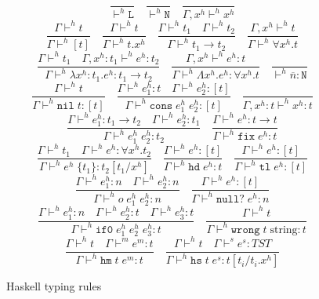 \begin{figure}[p]
\[
\frac{}{\vdash^h\mathtt{L}}
\quad
\frac{}{\vdash^h\mathtt{N}}
\quad
\frac{}{\Gamma,x^h\vdash^hx^h}
\]
\[
\frac{\Gamma\vdash^ht}{\Gamma\vdash^h[t]}
\quad
\frac{\Gamma\vdash^ht}{\Gamma\vdash^ht.x^h}
\quad
\frac{\Gamma\vdash^ht_1\quad\Gamma\vdash^ht_2}{\Gamma\vdash^ht_1\rightarrow t_2}
\quad
\frac{\Gamma,x^h\vdash^ht}{\Gamma\vdash^h\forall x^h.t}
\]
\bigskip
\[
\frac{\Gamma\vdash^ht_1\quad\Gamma,x^h:t_1\vdash^he^h:t_2}{\Gamma\vdash^h\lambda x^h:t_1.e^h:t_1\rightarrow t_2}
\quad
\frac{\Gamma,x^h\vdash^he^h:t}{\Gamma\vdash^h\Lambda x^h.e^h:\forall x^h.t}
\quad
\frac{}{\vdash^h\overline{n}:\mathtt{N}}
\]
\[
\frac{\Gamma\vdash^ht}{\Gamma\vdash^h\mathtt{nil}\;t:[t]}
\quad
\frac{\Gamma\vdash^he^h_1:t\quad\Gamma\vdash^he^h_2:[t]}{\Gamma\vdash^h\mathtt{cons}\;e^h_1\;e^h_2:[t]}
\quad
\frac{}{\Gamma,x^h:t\vdash^hx^h:t}
\]
\[
\frac{\Gamma\vdash^he^h_1:t_1\rightarrow t_2\quad\Gamma\vdash^he^h_2:t_1}{\Gamma\vdash^he^h_1\;e^h_2:t_2}
\quad
\frac{\Gamma\vdash^he^h:t\rightarrow t}{\Gamma\vdash^h\mathtt{fix}\;e^h:t}
\]
\[
\frac{\Gamma\vdash^ht_1\quad\Gamma\vdash^he^h:\forall x^h.t_2}{\Gamma\vdash^he^h\;\lbrace t_1\rbrace:t_2[t_1/x^h]}
\quad
\frac{\Gamma\vdash^he^h:[t]}{\Gamma\vdash^h\mathtt{hd}\;e^h:t}
\quad
\frac{\Gamma\vdash^he^h:[t]}{\Gamma\vdash^h\mathtt{tl}\;e^h:[t]}
\]
\[
\frac{\Gamma\vdash^he^h_1:n\quad\Gamma\vdash^he^h_2:n}{\Gamma\vdash^ho\;e^h_1\;e^h_2:n}
\quad
\frac{\Gamma\vdash^he^h:[t]}{\Gamma\vdash^h\mathtt{null?}\;e^h:n}
\]
\[
\frac{\Gamma\vdash^he^h_1:n\quad\Gamma\vdash^he^h_2:t\quad\Gamma\vdash^he^h_3:t}{\Gamma\vdash^h\mathtt{if0}\;e^h_1\;e^h_2\;e^h_3:t}
\quad
\frac{\Gamma\vdash^ht}{\Gamma\vdash^h\mathtt{wrong}\;t\;\mathrm{string}:t}
\]
\[
\frac{\Gamma\vdash^ht\quad\Gamma\vdash^me^m:t}{\Gamma\vdash^h\mathtt{hm}\;t\;e^m:t}
\quad
\frac{\Gamma\vdash^ht\quad\Gamma\vdash^se^s:TST}{\Gamma\vdash^h\mathtt{hs}\;t\;e^s:t[t_i/t_i.x^h]}
\]
\caption{Haskell typing rules}
\label{htr}
\end{figure}